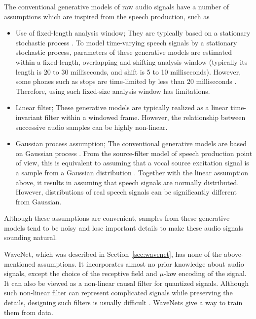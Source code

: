 The conventional generative models of raw audio signals have a number of assumptions which are inspired from the speech production, such as
\begin{itemize}
    \item Use of fixed-length analysis window; They are typically based on a stationary stochastic process \citep{LPC,UELS,Poritz_ARHMM_ICASSP82,Juang_MARHMM_ICASSP85,Kameoka_MultiKernelLPC_ASJ}.  To model time-varying speech signals by a stationary stochastic process, parameters of these generative models are estimated within a fixed-length, overlapping and shifting analysis window (typically its length is 20 to 30 milliseconds, and shift is 5 to 10 milliseconds).
    However, some phones such as stops are time-limited by less than 20 milliseconds \citep{Rabiner_ASR}.
    Therefore, using such fixed-size analysis window has limitations.
    \item Linear filter; These generative models are typically realized as a linear time-invariant filter  \citep{LPC,UELS,Poritz_ARHMM_ICASSP82,Juang_MARHMM_ICASSP85,Kameoka_MultiKernelLPC_ASJ} within a windowed frame.  However, the relationship between successive audio samples can be highly non-linear.
    \item Gaussian process assumption; The conventional generative models are based on Gaussian process \citep{LPC,UELS,Poritz_ARHMM_ICASSP82,Juang_MARHMM_ICASSP85,Kameoka_MultiKernelLPC_ASJ,Tokuda_CepLSTM_ICASSP2015,Tokuda_MixCepLSTM_ICASSP2016}.  From the source-filter model of speech production \citep{Chiba_SourceFilter,Fant_SourceFilter} point of view, this is equivalent to assuming that a vocal source excitation signal is a sample from a Gaussian distribution \citep{LPC,UELS,Poritz_ARHMM_ICASSP82,Juang_MARHMM_ICASSP85,Tokuda_CepLSTM_ICASSP2015,Kameoka_MultiKernelLPC_ASJ,Tokuda_MixCepLSTM_ICASSP2016}. 
    Together with the linear assumption above, it results in assuming that speech signals are normally distributed.
    However, distributions of real speech signals can be significantly different from Gaussian.
\end{itemize}
Although these assumptions are convenient, samples from these generative models tend to be noisy and lose important details to make these audio signals sounding natural.

WaveNet, which was described in Section~\ref{sec:wavenet}, has none of the above-mentioned assumptions.
It incorporates almost no prior knowledge about audio signals, except the choice of the receptive field and $\mu$-law encoding of the signal.
It can also be viewed as a non-linear causal filter for quantized signals.
Although such non-linear filter can represent complicated signals while preserving the details, designing such filters is usually difficult \citep{NonlinearFilterDesign}.
WaveNets give a way to train them from data.

